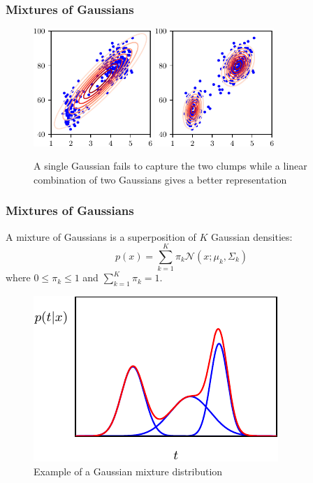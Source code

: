 \documentclass{beamer}
\begin{document}
\begin{frame}
    \frametitle{Mixtures of Gaussians}
    \begin{figure}
        \caption{A single Gaussian fails to capture the two clumps while a linear combination of two Gaussians gives a better representation}
        \includegraphics[width=0.4\textwidth]{Figure_6_a.pdf}
        \includegraphics[width=0.4\textwidth]{Figure_6_b.pdf}
    \end{figure}
\end{frame}

\begin{frame}
    \frametitle{Mixtures of Gaussians}
    A mixture of Gaussians is a superposition of $K$ Gaussian densities:
    \begin{equation*}
        p(x)=\sum_{k=1}^{K}\pi_{k}\mathcal{N}(x;\mu_{k},\Sigma_{k})
    \end{equation*}
    where $0\le\pi_{k}\le{}1$ and $\sum_{k=1}^{K}\pi_{k}=1$.
    \begin{figure}
        \caption{Example of a Gaussian mixture distribution}
        \includegraphics[height=0.3\textheight]{Figure_7.pdf}
    \end{figure}
\end{frame}
\end{document}
